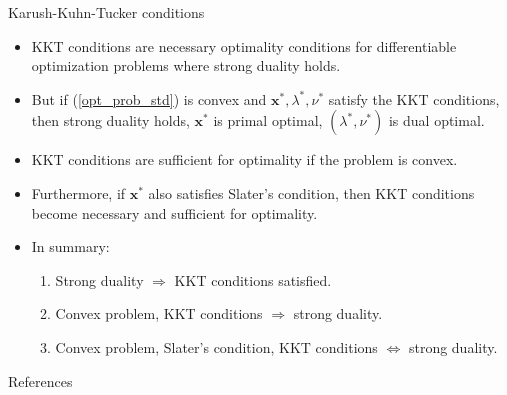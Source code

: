 \documentclass{beamer}
\numberwithin{equation}{section}
\newcommand{\aref}[1]{\alert{\ref{#1}}}
\begin{document}
\begin{frame}{Karush-Kuhn-Tucker conditions}
    \begin{itemize}
        \item
        KKT conditions are \alert{necessary} optimality conditions for
        differentiable optimization problems where strong duality holds.

        \item
        But if (\aref{opt_prob_std}) is convex and $ \mathbf{x}^*, \lambda^*,
        \nu^* $ satisfy the KKT conditions, then strong duality holds,
        $ \mathbf{x}^* $ is primal optimal, $ (\lambda^*, \nu^*) $ is dual
        optimal.

        \item
        KKT conditions are \alert{sufficient} for optimality if the problem is
        convex.
        
        \item        
        Furthermore, if $ \mathbf{x}^* $ also satisfies Slater's
        condition, then KKT conditions become \alert{necessary and sufficient}
        for optimality.

        \item
        In summary:
        \begin{enumerate}
            \item
            Strong duality $ \Rightarrow $ KKT conditions satisfied.

            \item
            Convex problem, KKT conditions $ \Rightarrow $ strong duality.

            \item
            Convex problem, Slater's condition, KKT conditions
            $ \Leftrightarrow $ strong duality.
        \end{enumerate}
    \end{itemize}
\end{frame}


\begin{frame}{References}
    
    
\end{frame}
\end{document}
